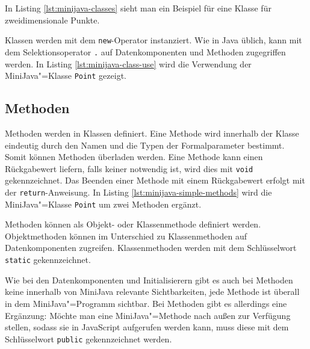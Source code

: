 In Listing \ref{lst:minijava-classes} sieht man ein Beispiel für eine Klasse für zweidimensionale Punkte.



Klassen werden mit dem \lstinline{new}-Operator instanziert. Wie in Java üblich, kann mit dem Selektionsoperator \lstinline{.} auf Datenkomponenten und Methoden zugegriffen werden. In Listing \ref{lst:minijava-class-use} wird die Verwendung der MiniJava"=Klasse \lstinline{Point} gezeigt.



\subsection{Methoden}
\label{subsec:MiniJava-Methoden}

Methoden werden in Klassen definiert. Eine Methode wird innerhalb der Klasse eindeutig durch den Namen und die Typen der Formalparameter bestimmt. Somit können Methoden überladen werden. Eine Methode kann einen Rückgabewert liefern, falls keiner notwendig ist, wird dies mit \lstinline{void} gekennzeichnet. Das Beenden einer Methode mit einem Rückgabewert erfolgt mit der \lstinline{return}-Anweisung. In Listing \ref{lst:minijava-simple-methods} wird die MiniJava"=Klasse \lstinline{Point} um zwei Methoden ergänzt.



Methoden können als Objekt- oder Klassenmethode definiert werden. Objektmethoden können im Unterschied zu Klassenmethoden auf Datenkomponenten zugreifen. Klassenmethoden werden mit dem Schlüsselwort \lstinline{static} gekennzeichnet.

Wie bei den Datenkomponenten und Initialisierern gibt es auch bei Methoden keine innerhalb von MiniJava relevante Sichtbarkeiten, jede Methode ist überall in dem MiniJava"=Programm sichtbar. Bei Methoden gibt es allerdings eine Ergänzung: Möchte man eine MiniJava"=Methode nach außen zur Verfügung stellen, sodass sie in JavaScript aufgerufen werden kann, muss diese mit dem Schlüsselwort \lstinline{public} gekennzeichnet werden.

